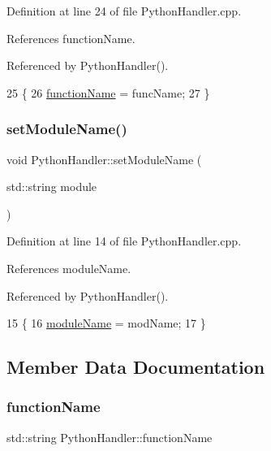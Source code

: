 Definition at line 24 of file Python\+Handler.\+cpp.



References function\+Name.



Referenced by Python\+Handler().


\begin{DoxyCode}
25 \{
26     \hyperlink{class_python_handler_a5946996068756c245e023cfe7e77f034}{functionName} = funcName;
27 \}
\end{DoxyCode}
\mbox{\label{class_python_handler_a035cda1c3987043041c7aeb8e3440f04}} 
\subsubsection{\texorpdfstring{set\+Module\+Name()}{setModuleName()}}
{\footnotesize\ttfamily void Python\+Handler\+::set\+Module\+Name (\begin{DoxyParamCaption}\item[{std\+::string}]{module }\end{DoxyParamCaption})}



Definition at line 14 of file Python\+Handler.\+cpp.



References module\+Name.



Referenced by Python\+Handler().


\begin{DoxyCode}
15 \{
16     \hyperlink{class_python_handler_ae29ce86e7c2dce2340caa90ba1d6ac72}{moduleName} = modName;
17 \}
\end{DoxyCode}


\subsection{Member Data Documentation}
\mbox{\label{class_python_handler_a5946996068756c245e023cfe7e77f034}} 
\subsubsection{\texorpdfstring{function\+Name}{functionName}}
{\footnotesize\ttfamily std\+::string Python\+Handler\+::function\+Name\hspace{0.3cm}{\ttfamily [private]}}



